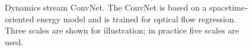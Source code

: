 \begin{figure}[t]
\begin{center}
\end{center}
\vspace{-0.45cm}
\caption[Dynamics stream ConvNet]{Dynamics stream ConvNet. The ConvNet is based on a
spacetime-oriented energy model
\cite{derpanis2012spacetime, simoncelli1998} and is trained
for optical flow regression.
Three scales are shown for illustration;
in practice five scales are used.}
\label{fig:MSOE}
\end{figure}